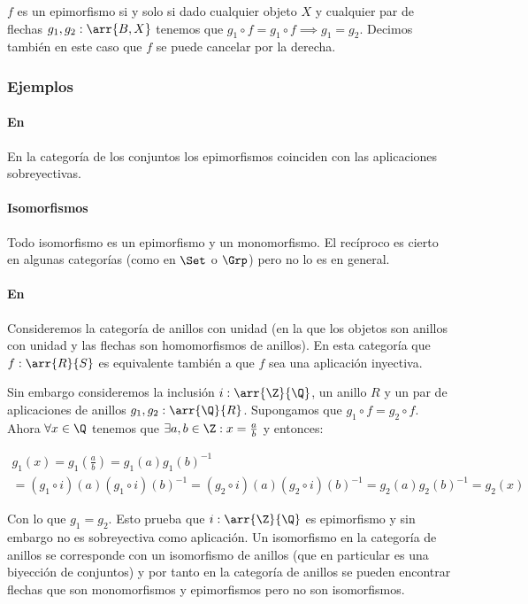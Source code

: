 \begin{proposition}
$f$ es un epimorfismo si y solo si dado cualquier objeto $X$ y
cualquier par de flechas $g_1, g_2 : \arr{B, X}$
tenemos que $g_1 \circ f = g_1 \circ f \implies g_1 = g_2$.
Decimos también en este caso que $f$ se puede cancelar por la
derecha.
\end{proposition}

\subsubsection{Ejemplos}
\paragraph{En \Set}
En la categoría de los conjuntos los epimorfismos coinciden con las
aplicaciones sobreyectivas.

\paragraph{Isomorfismos}
Todo isomorfismo es un epimorfismo y un monomorfismo. El recíproco
es cierto en algunas categorías (como en $\Set$ o $\Grp$) pero no
lo es en general.

\paragraph{En \Ring}
Consideremos la categoría de anillos con unidad (en la
que los objetos son anillos con unidad y
las flechas son homomorfismos de anillos). En esta categoría
que $f : \arr{R}{S}$ es equivalente también a que $f$ sea una aplicación
inyectiva.

Sin embargo consideremos la inclusión
$i : \arr{\Z}{\Q}$, un anillo $R$
y un par de aplicaciones de anillos $g_1, g_2 : \arr{\Q}{R}$. Supongamos
que $g_1 \circ f = g_2 \circ f$. Ahora  $\forall x \in \Q$
tenemos que $\exists a, b \in \Z : x = \frac{a}{b}$ y entonces:

\begin{multline*}
g_1(x) = g_1(\frac{a}{b}) = g_1(a)g_1(b)^{-1} \\
       = (g_1 \circ i)(a)(g_1\circ i)(b)^{-1}
       = (g_2\circ i)(a)(g_2\circ i)(b)^{-1}
       = g_2(a)g_2(b)^{-1} = g_2(x)
\end{multline*}

Con lo que $g_1=g_2$. Esto prueba que $i : \arr{\Z}{\Q}$ es epimorfismo
y sin embargo no es sobreyectiva como aplicación. Un isomorfismo en
la categoría de anillos se corresponde con un isomorfismo de anillos
(que en particular es una biyección de conjuntos) y por tanto
en la categoría de anillos se pueden encontrar flechas que son
monomorfismos y epimorfismos pero no son isomorfismos.

